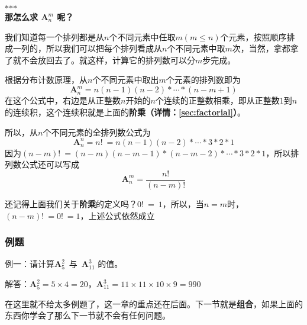 \noindent\hfil$*$\hfil$*$\hfil$*$\hfil \\

\textbf{那怎么求 $\textbf{A}_{n}^{m}$ 呢？} 

我们知道每一个排列都是从$n$个不同元素中任取$m(m \le n)$个元素，按照顺序排成一列的，所以我们可以把每个排列看成从$n$个不同元素中取$m$次，当然，拿都拿了就不会放回去了。就这样，计算它的排列数可以分$m$步完成。

根据分布计数原理，从$n$个不同元素中取出$m$个元素的排列数即为
\begin{equation*}
    \textbf{A}_{n}^{m} = n(n-1)(n-2)*\cdots{}*(n-m+1)
\end{equation*}
在这个公式中，右边是从正整数$n$开始的$n$个连续的正整数相乘，即从正整数$1$到$n$的连续积，这个连续积就是上面的\textbf{阶乘（详情：\ref{sec:factorial}）}。

所以，从$n$个不同元素的全排列数公式为
\begin{equation*}
    \textbf{A}_{n}^{n}=n!~=n(n-1)(n-2)*\cdots{}*3*2*1
\end{equation*}
因为$(n-m)!~=(n-m)(n-m-1)*(n-m-2)*\cdots{}*3*2*1$，所以排列数公式还可以写成
\begin{equation}
    \textbf{A}_{n}^{m}=\frac{n!}{(n-m)!}
\end{equation}

还记得上面我们关于\textbf{阶乘}的定义吗？$0!~=~1$，所以，当$n=m$时，$(n-m)!~=0!~=1$，上述公式依然成立

\subsubsection{例题}
{\color{blue} 例一：}{请计算$\textbf{A}_{5}^{2}$}~与~$\textbf{A}_{11}^{3}$ 的值。

{\color{blue} 解答：}$\textbf{A}_{5}^{2} = 5 \times 4 = 20$，$\textbf{A}_{11}^{3}=11 \times 11 \times 10 \times 9 = 990$

在这里就不给太多例题了，这一章的重点还在后面。下一节就是\textbf{组合}，如果上面的东西你学会了那么下一节就不会有任何问题。
